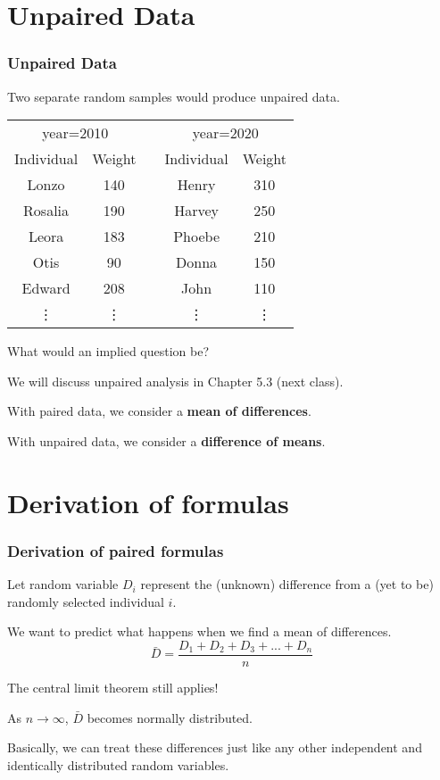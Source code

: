 \documentclass[11pt,containsverbatim,handout]{beamer}
\newcommand{\soln}[1]{ }
\begin{document}
\section{Unpaired Data}
\begin{frame}
\frametitle{Unpaired Data}
Two separate random samples would produce unpaired data.
\begin{center}
\begin{tabular}{|c|c|c|c|c|} \cline{1-2} \cline{4-5}
\multicolumn{2}{|c|}{year=2010} && \multicolumn{2}{|c|}{year=2020} \\ 
Individual & Weight && Individual& Weight \\ \cline{1-2} \cline{4-5}
Lonzo   & 140   && Henry & 310\\
Rosalia & 190   && Harvey & 250\\
Leora   & 183   && Phoebe & 210\\
Otis    & 90    && Donna & 150\\
Edward  & 208   && John & 110\\
\vdots&\vdots && \vdots & \vdots \\\cline{1-2} \cline{4-5}
\end{tabular}
\end{center}
What would an implied question be? \pause
\begin{center}
\soln{Did humans (as a species) tend to gain weight over time?}
\vfill
\end{center} \pause
We will discuss unpaired analysis in Chapter 5.3 (next class).

With paired data, we consider a {\bf mean of differences}.

With unpaired data, we consider a {\bf difference of means}.
\end{frame}

\newcommand{\Xd}{X_\text{diff}}
\newcommand{\xd}{x_\text{diff}}

\section{Derivation of formulas}
\begin{frame}
\frametitle{Derivation of paired formulas}
Let random variable $D_i$ represent the (unknown) difference from a (yet to be) randomly selected individual $i$. \pause

We want to predict what happens when we find a mean of differences.
$$\bar{D} = \frac{D_1+D_2+D_3+...+D_n}{n}$$ \pause

The central limit theorem still applies! \pause
\vfill

As $n\to \infty$, $\bar{D}$ becomes normally distributed.\pause
\vfill 

Basically, we can treat these differences just like any other independent and identically distributed random variables. 
\vfill
\end{frame}
\end{document}
